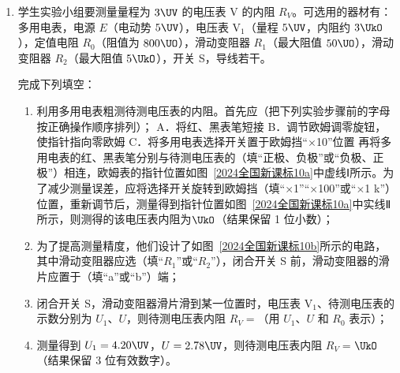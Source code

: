 \documentclass[\gkver]{gaokaozhenti}
\begin{document}
\begin{enumerate}
{如果碰撞过程系统动量守恒，则碰撞前后系统动量相等，则

$m_{a}v_{0} = m_{a}v_{a} + m_{b}v_{b}$

整理得 $m_{a}x_{P} = m_{a}x_{M} + m_{b}x_{N}$

小球离开斜槽末端后做平抛运动，竖直方向高度相同故下落时间相同，水平方向做匀速直线运动，小球水平飞出时的速度与平抛运动的水平位移成正比。
}

\item
学生实验小组要测量量程为 $3 \UV$ 的电压表 V 的内阻 $R_{V}$。可选用的器材有：多用电表，电源 $E$（电动势 $5 \UV$），电压表 V$_{1}$（量程 $5 \UV$，内阻约 $3 \UkO$），定值电阻 $R_{0}$（阻值为 $800 \UO$），滑动变阻器 $R_{1}$（最大阻值 $50 \UO$），滑动变阻器 $R_{2}$（最大阻值 $5 \UkO$），开关 S，导线若干。

完成下列填空：
\begin{enumerate}
	\item
	利用多用电表粗测待测电压表的内阻。首先应（把下列实验步骤前的字母按正确操作顺序排列）；
	A．将红、黑表笔短接
	B．调节欧姆调零旋钮，使指针指向零欧姆
	C．将多用电表选择开关置于欧姆挡“$\times$10”位置
	再将多用电表的红、黑表笔分别与待测电压表的（填“正极、负极”或“负极、正极”）相连，欧姆表的指针位置如图~\ref{2024全国新课标10a}中虚线Ⅰ所示。为了减少测量误差，应将选择开关旋转到欧姆挡（填“$\times$1”“$\times$100”或“$\times$1 k”）位置，重新调节后，测量得到指针位置如图~\ref{2024全国新课标10a}中实线Ⅱ所示，则测得的该电压表内阻为$\UkO$（结果保留 1 位小数）；
	\item
	为了提高测量精度，他们设计了如图~\ref{2024全国新课标10b}所示的电路，其中滑动变阻器应选（填“$R_{1}$”或“$R_{2}$”），闭合开关 S 前，滑动变阻器的滑片应置于（填“a”或“b”）端；
	\item
	闭合开关 S，滑动变阻器滑片滑到某一位置时，电压表 V$_{1}$、待测电压表的示数分别为 $U_{1}$、$U$，则待测电压表内阻 $R_{V} = $（用 $U_{1}$、$U$ 和 $R_{0}$ 表示）；
	\item
	测量得到 $U_{1} = 4.20 \UV$，$U = 2.78 \UV$，则待测电压表内阻 $R_{V} = $$\UkO$（结果保留 3 位有效数字）。
\end{enumerate}
\end{enumerate}
\end{document}
